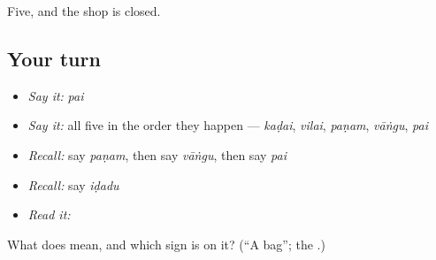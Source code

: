 \begin{grammarlens}[title={What you've built}]
Five, and the shop is closed.
\end{grammarlens}

\subsection*{Your turn}
\begin{itemize}
\raggedright
  \item \emph{Say it:} \emph{pai}
  \item \emph{Say it:} all five in the order they happen — \emph{kaḍai}, \emph{vilai}, \emph{paṇam}, \emph{vāṅgu}, \emph{pai}
  \item \emph{Recall:} say \emph{paṇam}, then say \emph{vāṅgu}, then say \emph{pai}
  \item \emph{Recall:} say \emph{iḍadu}
  \item \emph{Read it:} \textbf{}
\end{itemize}

\begin{tcolorbox}[breakable,colback=teal!4,colframe=teal!35!black,title={Before you move on}]
What does  mean, and which sign is on it? (\textquotedblleft{}A bag\textquotedblright{}; the \textbf{}.)
\end{tcolorbox}
